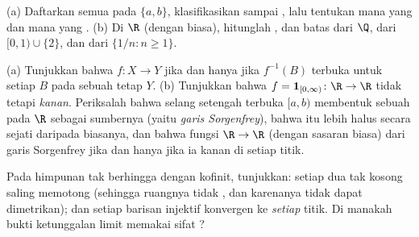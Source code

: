 \begin{exercise}[$\star$]\label{exo:b3:topology:1}
(a) Daftarkan semua  pada $\{a, b\}$, klasifikasikan sampai
, lalu tentukan mana yang  dan mana
yang .
(b) Di $\R$ (dengan  biasa), hitunglah ,  dan
batas dari $\Q$, dari $[0,1) \cup \{2\}$, dan dari $\{1/n : n \geq
1\}$.
\end{exercise}

\begin{exercise}[$\star$]\label{exo:b3:topology:2}
(a) Tunjukkan bahwa $f\colon X \to Y$  jika dan hanya jika $f^{-1}(B)$
terbuka untuk setiap $B$ pada sebuah  tetap $Y$.
(b) Tunjukkan bahwa $f = \mathbf 1_{[0,\infty)} \colon \R \to \R$
tidak  tetapi \emph{ kanan}. Periksalah bahwa
selang setengah terbuka $[a, b)$ membentuk  sebuah  pada
$\R$ sebagai sumbernya (yaitu \emph{garis Sorgenfrey}), bahwa  itu
lebih halus secara sejati daripada  biasanya, dan bahwa fungsi $\R \to
\R$ (dengan sasaran biasa)  dari garis Sorgenfrey jika dan hanya jika ia
 kanan di setiap titik.
\end{exercise}

\begin{exercise}[$\star$]\label{exo:b3:topology:3}
Pada himpunan tak berhingga dengan  kofinit, tunjukkan: setiap dua
 tak kosong saling memotong (sehingga ruangnya tidak , dan karenanya
tidak dapat dimetrikan); dan setiap barisan injektif konvergen ke
\emph{setiap} titik. Di manakah bukti ketunggalan limit
memakai sifat ?
\end{exercise}

